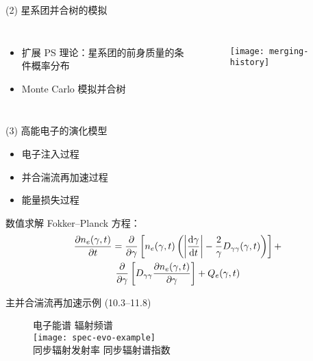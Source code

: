 \documentclass{beamer}
\begin{document}
\begin{frame}[t]
  \begin{alertblock}{(2) 星系团并合树的模拟}
  \end{alertblock}
  \begin{columns}
    \begin{itemize}
      \item 扩展 PS 理论：星系团的前身质量的条件概率分布
      \item Monte Carlo 模拟并合树
    \end{itemize}

    \begin{figure}
      \centering
      \texttt{[image: merging-history]}
    \end{figure}
  \end{columns}
\end{frame}

\begin{frame}[t]
  \begin{alertblock}{(3) 高能电子的演化模型}
    \begin{itemize}
      \item 电子注入过程
      \item 并合湍流再加速过程
      \item 能量损失过程
    \end{itemize}
    数值求解 Fokker--Planck 方程：
  \begin{multline}
    \frac{\partial n_e(\gamma, t)}{\partial t} =
      \frac{\partial }{\partial \gamma} \left[ n_e(\gamma, t) \left(
        \left| \frac{\text{d}\gamma}{\text{d}t} \right| -
        \frac{2}{\gamma} D_{\gamma\gamma}(\gamma, t) \right) \right] + \\
      \frac{\partial }{\partial \gamma} \left[
      D_{\gamma\gamma} \frac{\partial n_e(\gamma, t)}{\partial \gamma} \right]
      + Q_e(\gamma, t)
  \end{multline}
  \end{alertblock}
\end{frame}

\begin{frame}[t]
  \begin{block}{主并合湍流再加速示例 (\SIrange{10.3}{11.8}{\Gyr})}
  \end{block}
  \vspace{-1.5ex}
  \begin{figure}
    \centering\footnotesize
    \hspace{2.5em} 电子能谱 \hspace{9em} 辐射频谱 \\
    \texttt{[image: spec-evo-example]} \\
    \hspace{2.5em} 同步辐射发射率 \hspace{7em} 同步辐射谱指数
  \end{figure}
\end{frame}
\end{document}
